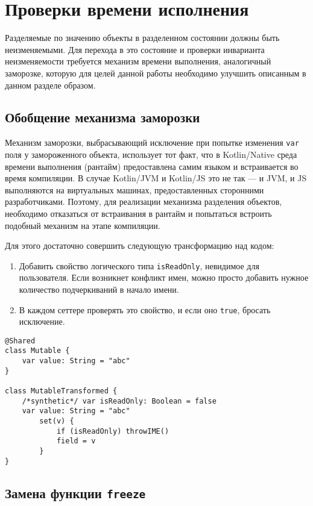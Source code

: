 \documentclass[specification,annotation,times]{itmo-student-thesis}
\begin{document}
\section{Проверки времени исполнения}

Разделяемые по значению объекты в разделенном состоянии должны быть неизменяемыми.
Для перехода в это состояние и проверки инварианта неизменяемости требуется механизм времени выполнения, аналогичный заморозке, которую для целей данной работы необходимо улучшить описанным в данном разделе образом. 

\subsection{Обобщение механизма заморозки}

Механизм заморозки, выбрасывающий исключение при попытке изменения \texttt{var} поля у замороженного объекта, использует тот факт, что в Kotlin/Native среда времени выполнения (рантайм) предоставлена самим языком и встраивается во время компиляции.
В случае Kotlin/JVM и Kotlin/JS это не так –-- и JVM, и JS выполняются на виртуальных машинах, предоставленных сторонними разработчиками.
Поэтому, для реализации механизма разделения объектов, необходимо отказаться от встраивания в рантайм и попытаться встроить подобный механизм на этапе компиляции.

Для этого достаточно совершить следующую трансформацию над кодом: 

\begin{enumerate}
	\item Добавить свойство логического типа \texttt{isReadOnly}, невидимое для пользователя. Если возникнет конфликт имен, можно просто добавить нужное количество подчеркиваний в начало имени.
	\item В каждом сеттере проверять это свойство, и если оно \texttt{true}, бросать исключение.
\end{enumerate}


\begin{lstlisting}[float=h!,caption={Код до и после трансформации}]
@Shared
class Mutable {
	var value: String = "abc"
}

class MutableTransformed {
	/*synthetic*/ var isReadOnly: Boolean = false
	var value: String = "abc"
		set(v) {
			if (isReadOnly) throwIME() 
			field = v
		}
}
\end{lstlisting}

\subsection{Замена функции \texttt{freeze}}\label{def_share}
\end{document}
